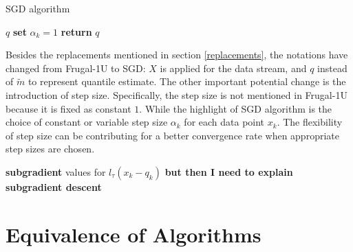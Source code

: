 \begin{algorithm}
    \caption{SGD algorithm}\label{alg:SGD}
    \begin{algorithmic}[1]
         $q$                 
                              
                \State \textbf{set} $\alpha_k = 1$  
                                  
                \Else                           {}
                \EndIf
            \EndFor
        \State \textbf{return} $q$              
    \end{algorithmic}
\end{algorithm}
Besides the replacements mentioned in section \ref{replacements}, the notations have changed from Frugal-1U to SGD: 
$X$ is applied for the data stream, and $q$ instead of $\tilde{m}$ to represent quantile estimate. The other important potential change is the introduction of step size. Specifically, the step size is not mentioned in Frugal-1U because it is fixed as constant $1$. While the highlight of SGD algorithm is the choice of constant or variable step size $\alpha_k$ for each data point $x_k$. The flexibility of step size can be contributing for a better convergence rate when appropriate step sizes are chosen.


\textbf{subgradient} values for $l_\tau(x_k - q_k)$ 
{\color{red} \textbf{but then I need to explain subgradient descent}} 
\section{Equivalence of Algorithms}
\label{sec: algo_equivalence}

